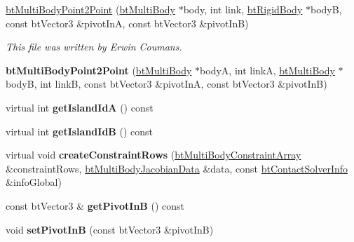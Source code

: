\begin{DoxyCompactItemize}
\item 
\hypertarget{classbt_multi_body_point2_point_a0c1306efc09b87bb9d39111daf82daf5}{\hyperlink{classbt_multi_body_point2_point_a0c1306efc09b87bb9d39111daf82daf5}{bt\+Multi\+Body\+Point2\+Point} (\hyperlink{classbt_multi_body}{bt\+Multi\+Body} $\ast$body, int link, \hyperlink{classbt_rigid_body}{bt\+Rigid\+Body} $\ast$body\+B, const bt\+Vector3 \&pivot\+In\+A, const bt\+Vector3 \&pivot\+In\+B)}\label{classbt_multi_body_point2_point_a0c1306efc09b87bb9d39111daf82daf5}

\begin{DoxyCompactList}\small\item\em This file was written by Erwin Coumans. \end{DoxyCompactList}\item 
\hypertarget{classbt_multi_body_point2_point_af7a950d153633ec5b7b41e8c91f54073}{{\bfseries bt\+Multi\+Body\+Point2\+Point} (\hyperlink{classbt_multi_body}{bt\+Multi\+Body} $\ast$body\+A, int link\+A, \hyperlink{classbt_multi_body}{bt\+Multi\+Body} $\ast$body\+B, int link\+B, const bt\+Vector3 \&pivot\+In\+A, const bt\+Vector3 \&pivot\+In\+B)}\label{classbt_multi_body_point2_point_af7a950d153633ec5b7b41e8c91f54073}

\item 
\hypertarget{classbt_multi_body_point2_point_a07a868e7c80cf4cb383e5218e8ebf7d9}{virtual int {\bfseries get\+Island\+Id\+A} () const }\label{classbt_multi_body_point2_point_a07a868e7c80cf4cb383e5218e8ebf7d9}

\item 
\hypertarget{classbt_multi_body_point2_point_a0a1423c6cae4b0f90266671723b618a5}{virtual int {\bfseries get\+Island\+Id\+B} () const }\label{classbt_multi_body_point2_point_a0a1423c6cae4b0f90266671723b618a5}

\item 
\hypertarget{classbt_multi_body_point2_point_a66c84891560b0c53bb6ec69629f5fec3}{virtual void {\bfseries create\+Constraint\+Rows} (\hyperlink{classbt_aligned_object_array}{bt\+Multi\+Body\+Constraint\+Array} \&constraint\+Rows, \hyperlink{structbt_multi_body_jacobian_data}{bt\+Multi\+Body\+Jacobian\+Data} \&data, const \hyperlink{structbt_contact_solver_info}{bt\+Contact\+Solver\+Info} \&info\+Global)}\label{classbt_multi_body_point2_point_a66c84891560b0c53bb6ec69629f5fec3}

\item 
\hypertarget{classbt_multi_body_point2_point_a3ac112266db9980687cc23832a71ec76}{const bt\+Vector3 \& {\bfseries get\+Pivot\+In\+B} () const }\label{classbt_multi_body_point2_point_a3ac112266db9980687cc23832a71ec76}

\item 
\hypertarget{classbt_multi_body_point2_point_acbf08dcd31ad18b9ffd8d07231ee5d4c}{void {\bfseries set\+Pivot\+In\+B} (const bt\+Vector3 \&pivot\+In\+B)}\label{classbt_multi_body_point2_point_acbf08dcd31ad18b9ffd8d07231ee5d4c}

\end{DoxyCompactItemize}
